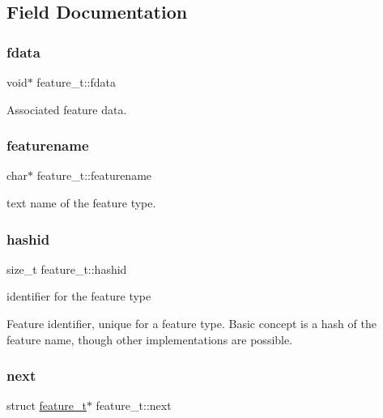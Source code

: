 \subsection{Field Documentation}
\mbox{\label{structfeature__t_a363d3009c71db9c2294f5227ce186649}} 
\subsubsection{\texorpdfstring{fdata}{fdata}}
{\footnotesize\ttfamily void$\ast$ feature\+\_\+t\+::fdata}

Associated feature data. \mbox{\label{structfeature__t_a2d4a7e92af0cf4e2bdfc04ec3fb60fb5}} 
\subsubsection{\texorpdfstring{featurename}{featurename}}
{\footnotesize\ttfamily char$\ast$ feature\+\_\+t\+::featurename}



text name of the feature type. 

\mbox{\label{structfeature__t_a9622cb072e66eb7ad9dd21feeaf8991c}} 
\subsubsection{\texorpdfstring{hashid}{hashid}}
{\footnotesize\ttfamily size\+\_\+t feature\+\_\+t\+::hashid}



identifier for the feature type 

Feature identifier, unique for a feature type. Basic concept is a hash of the feature name, though other implementations are possible. \mbox{\label{structfeature__t_ab77c0648e065a1f6063e5c81615a6698}} 
\subsubsection{\texorpdfstring{next}{next}}
{\footnotesize\ttfamily struct \hyperlink{structfeature__t}{feature\+\_\+t}$\ast$ feature\+\_\+t\+::next}

